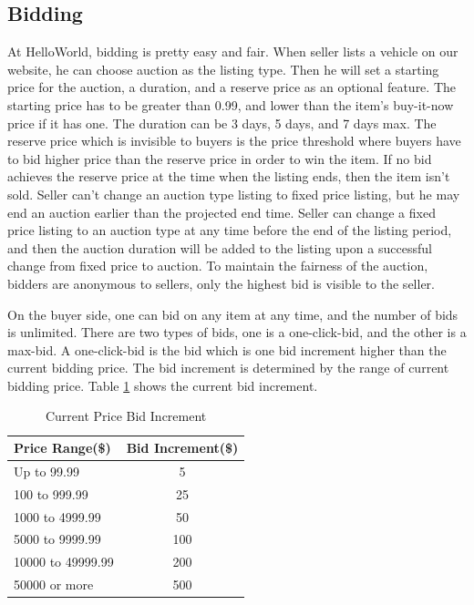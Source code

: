 \documentclass[12pt]{article}
\begin{document}
\subsection{Bidding}
At HelloWorld, bidding is pretty easy and fair. When seller lists a vehicle on our website, he can choose auction as the listing type. Then he will set a starting price for the auction, a duration, and a reserve price as an optional feature. The starting price has to be greater than 0.99, and lower than the item's buy-it-now price if it has one. The duration can be 3 days, 5 days, and 7 days max. The reserve price which is invisible to buyers is the price threshold where buyers have to bid higher price than the reserve price in order to win the item. If no bid achieves the reserve price at the time when the listing ends, then the item isn't sold. Seller can't change an auction type listing to fixed price listing, but he may end an auction earlier than the projected end time. Seller can change a fixed price listing to an auction type at any time before the end of the listing period, and then the auction duration will be added to the listing upon a successful change from fixed price to auction. To maintain the fairness of the auction, bidders are anonymous to sellers, only the highest bid is visible to the seller. \par
On the buyer side, one can bid on any item at any time, and the number of bids is unlimited. There are two types of bids, one is a one-click-bid, and the other is a max-bid. A one-click-bid is the bid which is one bid increment higher than the current bidding price. The bid increment is determined by the range of current bidding price. Table \ref{pricebid} shows the current bid increment.
\begin{table}[!h]
\caption{Current Price Bid Increment}\label{pricebid}
\begin{center}
\begin{tabular}{|l|c|}
\hline
Price Range(\$) & Bid Increment(\$)\\ \hline
Up to 99.99 & 5\\ \hline
100 to 999.99 & 25\\ \hline
1000 to 4999.99 & 50\\ \hline
5000 to 9999.99 & 100\\ \hline
10000 to 49999.99 & 200\\ \hline
50000 or more & 500\\ \hline
\end{tabular}
\end{center}
\end{table}
\end{document}
